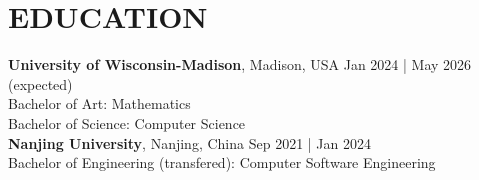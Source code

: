 \section*{EDUCATION}
\noindent
\textbf{University of Wisconsin-Madison}, Madison, USA \hfill Jan 2024 | May 2026 (expected)\\
Bachelor of Art: Mathematics \\
Bachelor of Science: Computer Science \hfill \\

\noindent
\textbf{Nanjing University},  Nanjing, China \hfill Sep 2021 | Jan 2024\\
Bachelor of Engineering (transfered): Computer Software Engineering  %
